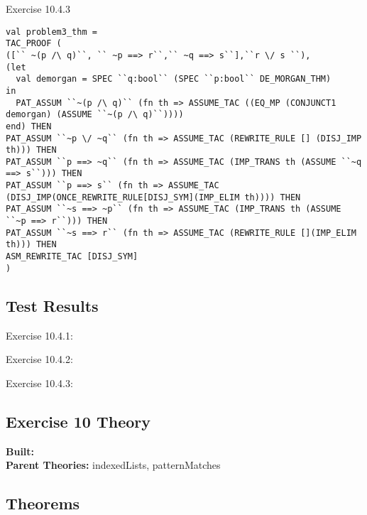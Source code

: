 \documentclass[11pt, twoside]{article}
\begin{document}
Exercise 10.4.3
\begin{lstlisting}[basicstyle=\tiny,]
val problem3_thm = 
TAC_PROOF (
([`` ~(p /\ q)``, `` ~p ==> r``,`` ~q ==> s``],``r \/ s ``),
(let
  val demorgan = SPEC ``q:bool`` (SPEC ``p:bool`` DE_MORGAN_THM)
in
  PAT_ASSUM ``~(p /\ q)`` (fn th => ASSUME_TAC ((EQ_MP (CONJUNCT1 demorgan) (ASSUME ``~(p /\ q)``))))
end) THEN
PAT_ASSUM ``~p \/ ~q`` (fn th => ASSUME_TAC (REWRITE_RULE [] (DISJ_IMP th))) THEN
PAT_ASSUM ``p ==> ~q`` (fn th => ASSUME_TAC (IMP_TRANS th (ASSUME ``~q ==> s``))) THEN
PAT_ASSUM ``p ==> s`` (fn th => ASSUME_TAC (DISJ_IMP(ONCE_REWRITE_RULE[DISJ_SYM](IMP_ELIM th)))) THEN
PAT_ASSUM ``~s ==> ~p`` (fn th => ASSUME_TAC (IMP_TRANS th (ASSUME ``~p ==> r``))) THEN
PAT_ASSUM ``~s ==> r`` (fn th => ASSUME_TAC (REWRITE_RULE [](IMP_ELIM th))) THEN
ASM_REWRITE_TAC [DISJ_SYM]
)
\end{lstlisting}

\newpage 

\subsection{Test Results}

Exercise 10.4.1:



Exercise 10.4.2:



Exercise 10.4.3:


\newpage

\HOLpagestyle


\subsection{Exercise 10 Theory}
\begin{flushleft}
\textbf{Built:} \HOLexerciseOneZeroDate \\[2pt]
\textbf{Parent Theories:} indexedLists, patternMatches
\end{flushleft}



\subsection{Theorems}
\end{document}
